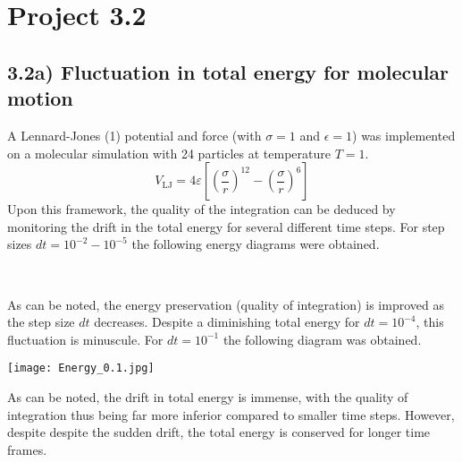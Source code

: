 \documentclass[12pt]{article}
\begin{document}
\newpage 
\section*{Project 3.2}
\subsection*{3.2a) Fluctuation in total energy for molecular motion}
A Lennard-Jones (1) potential and force (with $\sigma = 1$ and $\epsilon=1$) was implemented on a molecular simulation with 24 particles at temperature $T = 1$.
\begin{equation}
V_\text{LJ} = 4\varepsilon \left[ \left(\frac{\sigma}{r}\right)^{12} - \left(\frac{\sigma}{r}\right)^6 \right]   
\end{equation}
Upon this framework, the quality
of the integration can be deduced by monitoring the drift in the total energy for several different time steps. For
step sizes $dt = 10^{-2} - 10^{-5}$ the following energy diagrams were obtained.

\begin{figure*}[ht!]
\begin{center}
   \\
   \caption{\label{workflow} (a) $dt = 10^{-2}$ \& $10^{-3}$  (b) $dt = 10^{-3}$ \& $10^{-4}$ (c) $dt = 10^{-4}$ \& $10^{-5}$}
\end{center}
\end{figure*}
\noindent As can be noted, the energy preservation (quality of integration) is improved as the step size $dt$ decreases. Despite a diminishing total energy for  $dt = 10^{-4}$, this fluctuation is minuscule. For $dt = 10^{-1}$ the following diagram was obtained.
\begin{figure*}[ht!]
\begin{center}
    \texttt{[image: Energy\_0.1.jpg]}
 \caption{Energy drift for $dt = 10^{-1}$}
\end{center}
\end{figure*}

\noindent As can be noted, the drift in total energy is immense, with the quality of integration thus being far more inferior compared to smaller time steps.
However, despite despite the sudden drift, the total energy is conserved for longer time frames.
\newpage 
\end{document}
